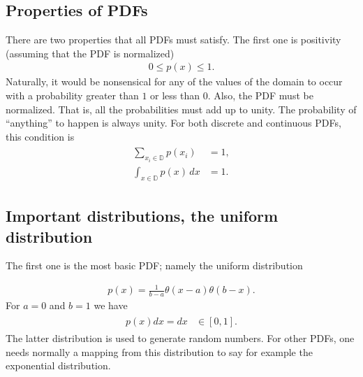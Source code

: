 \documentclass[letterpaper,10pt,english]{sphinxmanual}
\begin{document}
\subsection{Properties of PDFs}
\label{\detokenize{chapter3:properties-of-pdfs}}
There are two properties that all PDFs must satisfy. The first one is
positivity (assuming that the PDF is normalized)
\begin{equation*}
\begin{split}
0 \leq p(x) \leq 1.
\end{split}
\end{equation*}
Naturally, it would be nonsensical for any of the values of the domain
to occur with a probability greater than \(1\) or less than \(0\). Also,
the PDF must be normalized. That is, all the probabilities must add up
to unity.  The probability of “anything” to happen is always unity. For
both discrete and continuous PDFs, this condition is
\begin{equation*}
\begin{split}
\begin{align*}
\sum_{x_i\in\mathbb D} p(x_i) & =  1,\\
\int_{x\in\mathbb D} p(x)\,dx & =  1.
\end{align*}
\end{split}
\end{equation*}

\subsection{Important distributions, the uniform distribution}
\label{\detokenize{chapter3:important-distributions-the-uniform-distribution}}
The first one
is the most basic PDF; namely the uniform distribution




\begin{equation*}
\begin{split}
\begin{equation}
p(x) = \frac{1}{b-a}\theta(x-a)\theta(b-x).
\label{eq:unifromPDF} \tag{1}
\end{equation}
\end{split}
\end{equation*}
For \(a=0\) and \(b=1\) we have
\begin{equation*}
\begin{split}
\begin{array}{ll}
p(x)dx = dx & \in [0,1].
\end{array}
\end{split}
\end{equation*}
The latter distribution is used to generate random numbers. For other PDFs, one needs normally a mapping from this distribution to say for example the exponential distribution.
\end{document}
